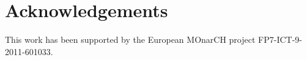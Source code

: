 
  



\section*{Acknowledgements}

This work has been supported by the European MOnarCH project FP7-ICT-9-2011-601033. 


